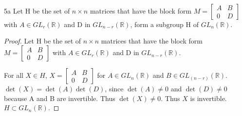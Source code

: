 \documentclass{article}
\newcommand{\R}{\mathbb{R}}
\begin{document}
\begin{claim}{5a}
    Let H be the set of $n \times n$ matrices that have the block form $M = \begin{bmatrix*}{}
        A & B \\
        0 & D
    \end{bmatrix*}$ with $A \in GL_r(\R)$ and D in $GL_{n-r}(\R)$, form a subgroup H of $GL_n(\R)$.
\end{claim}
\begin{proof}
    Let H be the set of $n \times n$ matrices that have the block form $M = \begin{bmatrix*}{}
        A & B \\
        0 & D
    \end{bmatrix*}$ with $A \in GL_r(\R)$ and D in $GL_{n-r}(\R)$. 

    For all $X \in H$, $X = \begin{bmatrix*}{}
        A & B \\
        0 & D
    \end{bmatrix*}$ for $A \in GL_n(\R)$ and $B \in GL_{(n-r)}(\R)$. $\det(X) = \det(A)\det(D)$, since $\det(A) \neq 0$ and $\det(D) \neq 0$ because A and B are invertible. Thus $\det(X) \neq 0$. Thus $X$ is invertible. $H \subset GL_n(\R)$.


\end{proof}
\end{document}
